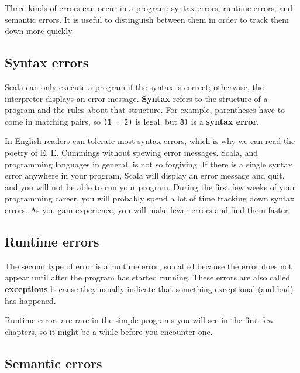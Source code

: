 \documentclass[10pt]{book}
\begin{document}
Three kinds of errors can occur in a program: syntax errors, runtime errors, and semantic errors. It is useful 
to distinguish between them in order to track them down more quickly.

\subsection{Syntax errors}

Scala can only execute a program if the syntax is correct; otherwise, the interpreter displays an error message.  
{\bf Syntax} refers to the structure of a program and the rules about that structure. For example, parentheses 
have to come in matching pairs, so {\tt (1 + 2)} is legal, but {\tt 8)} is a {\bf syntax error}.


In English readers can tolerate most syntax errors, which is why we can read the poetry of E. E. Cummings without 
spewing error messages. Scala, and programming languages in general, is not so forgiving.  If there is a single syntax
error anywhere in your program, Scala will display an error message and quit, and you will not be able to run your
program. During the first few weeks of your programming career, you will probably spend a lot of time tracking down
syntax errors.  As you gain experience, you will make fewer errors and find them faster.

\subsection{Runtime errors}
\label{runtime}

The second type of error is a runtime error, so called because the error does not appear until after the 
program has started running. These errors are also called {\bf exceptions} because they usually indicate 
that something exceptional (and bad) has happened.

Runtime errors are rare in the simple programs you will see in the first few chapters, so it might be a 
while before you encounter one.

\subsection{Semantic errors}
\end{document}
